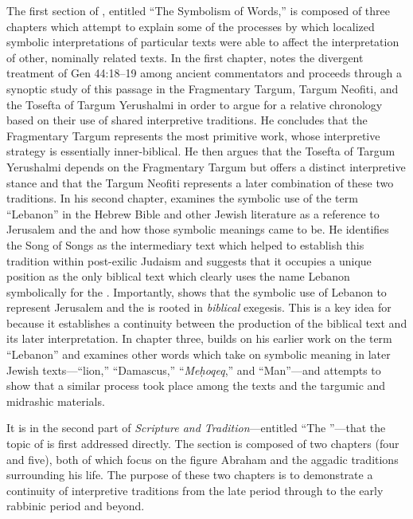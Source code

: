 The first section of , entitled ``The Symbolism of Words,'' is composed of three chapters which attempt to explain some of the processes by which localized symbolic interpretations of particular texts were able to affect the interpretation of other, nominally related texts.
%
In the first chapter, \vermes notes the divergent treatment of Gen 44:18--19 among ancient commentators and proceeds through a synoptic study of this passage in the Fragmentary Targum, Targum Neofiti, and the Tosefta of Targum Yerushalmi in order to argue for a relative chronology based on their use of shared interpretive traditions. He concludes that the Fragmentary Targum represents the most primitive work, whose interpretive strategy is essentially inner-biblical. He then argues that the Tosefta of Targum Yerushalmi depends on the Fragmentary Targum but offers a distinct interpretive stance and that the Targum Neofiti represents a later combination of these two traditions.
%
In his second chapter, \vermes examines the symbolic use of the term ``Lebanon'' in the Hebrew Bible and other Jewish literature as a reference to Jerusalem and the \temple and how those symbolic meanings came to be. He identifies the Song of Songs as the intermediary text which helped to establish this tradition within post-exilic Judaism and suggests that it occupies a unique position as the only biblical text which clearly uses the name Lebanon symbolically for the \temple. Importantly, \vermes shows that the symbolic use of Lebanon to represent Jerusalem and the \temple is rooted in \emph{biblical} exegesis. This is a key idea for \vermes because it establishes a continuity between the production of the biblical text and its later interpretation.
%
In chapter three, \vermes builds on his earlier work on the term ``Lebanon'' and examines other words which take on symbolic meaning in later Jewish texts---``lion,'' ``Damascus,'' ``\emph{Meḥoqeq},'' and ``Man''---and attempts to show that a similar process took place among the \dss texts and the targumic and midrashic materials. 

It is in the second part of \emph{Scripture and Tradition}---entitled ``The \rwb''---that the topic of \rwb is first addressed directly. The section is composed of two chapters (four and five), both of which focus on the figure Abraham and the aggadic traditions surrounding his life. The purpose of these two chapters is to demonstrate a continuity of interpretive traditions from the late \secondtemple period through to the early rabbinic period and beyond. 

